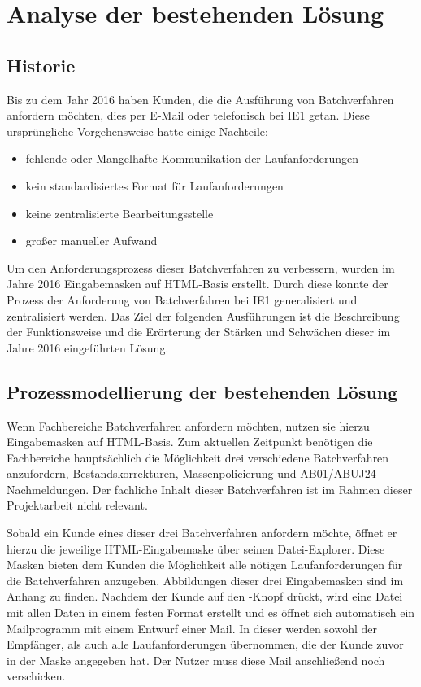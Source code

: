 \section{Analyse der bestehenden Lösung}

	\subsection{Historie}
	
		Bis zu dem Jahr 2016 haben Kunden, die die Ausführung von Batchverfahren anfordern möchten, dies per E-Mail oder telefonisch bei \ac{IE1} getan. Diese ursprüngliche Vorgehensweise hatte einige Nachteile:
		
		\begin{itemize}
			\item fehlende oder Mangelhafte Kommunikation der Laufanforderungen
			\item kein standardisiertes Format für Laufanforderungen 
			\item keine zentralisierte Bearbeitungsstelle
			\item großer manueller Aufwand
		\end{itemize}

		Um den Anforderungsprozess dieser Batchverfahren zu verbessern, wurden im Jahre 2016 Eingabemasken auf HTML-Basis erstellt. Durch diese konnte der Prozess der Anforderung von Batchverfahren bei \ac{IE1} generalisiert und zentralisiert werden. Das Ziel der folgenden Ausführungen ist die Beschreibung der Funktionsweise und die Erörterung der Stärken und Schwächen dieser im Jahre 2016 eingeführten Lösung.      

	\subsection{Prozessmodellierung der bestehenden Lösung}
	
		Wenn Fachbereiche Batchverfahren anfordern möchten, nutzen sie hierzu Eingabemasken auf HTML-Basis. Zum aktuellen Zeitpunkt benötigen die Fachbereiche hauptsächlich die Möglichkeit drei verschiedene Batchverfahren anzufordern, Bestandskorrekturen, Massenpolicierung und AB01/ABUJ24 Nachmeldungen. Der fachliche Inhalt dieser Batchverfahren ist im Rahmen dieser Projektarbeit nicht relevant.
		
		Sobald ein Kunde eines dieser drei Batchverfahren anfordern möchte, öffnet er hierzu die jeweilige HTML-Eingabemaske über seinen Datei-Explorer. Diese Masken bieten dem Kunden die Möglichkeit alle nötigen Laufanforderungen für die Batchverfahren anzugeben. Abbildungen dieser drei Eingabemasken sind im Anhang zu finden.  Nachdem der Kunde auf den -Knopf drückt, wird eine Datei mit allen Daten in einem festen Format erstellt und es öffnet sich automatisch ein Mailprogramm mit einem Entwurf einer Mail. In dieser werden sowohl der Empfänger, als auch alle Laufanforderungen übernommen, die der Kunde zuvor in der Maske angegeben hat. Der Nutzer muss diese Mail anschließend noch verschicken. 
		
